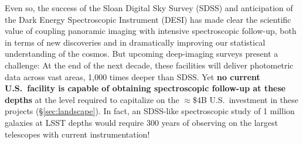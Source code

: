 \documentclass[oneside,11pt]{amsart}
\begin{document}
%

Even so, the success of the Sloan Digital Sky Survey (SDSS) and anticipation of the Dark Energy Spectroscopic Instrument (DESI) has made clear the scientific value of coupling panoramic imaging with intensive spectroscopic follow-up, both in terms of new discoveries and in dramatically improving our statistical understanding of the cosmos. But upcoming deep-imaging surveys present a challenge: At the end of the next decade, these facilities will deliver photometric data across vast areas, 1,000 times deeper than SDSS.  Yet \textbf{no current U.S.~facility is capable of obtaining spectroscopic follow-up at these depths} at the level required to capitalize on the $\approx$\$4B U.S.\ investment in these projects (\S \ref{sec:landscape}). In fact, an SDSS-like spectroscopic study of 1 million galaxies at LSST depths would require 300 years of observing on the largest telescopes with current instrumentation!
\end{document}
